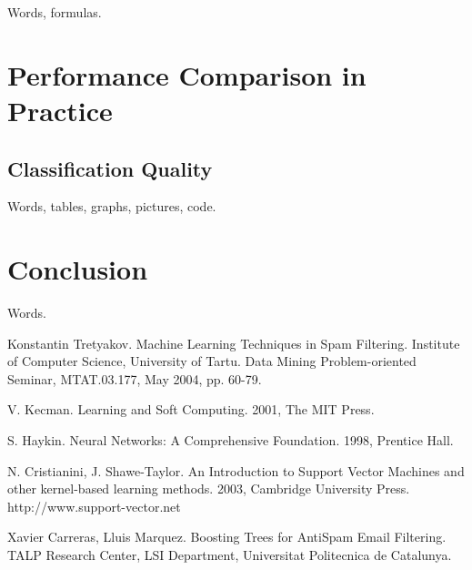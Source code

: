 \documentclass[12pt]{report}
\begin{document}
Words, formulas.

\newpage


\chapter{Performance Comparison in Practice}

\section{Classification Quality}

Words, tables, graphs, pictures, code.

\newpage


\chapter*{Conclusion}

Words.

\newpage



\begin{thebibliography}{30}

 Konstantin Tretyakov. Machine Learning Techniques in Spam Filtering. Institute of Computer Science, University of Tartu. Data Mining Problem-oriented Seminar, MTAT.03.177, May 2004, pp. 60-79.

 V. Kecman. Learning and Soft Computing. 2001, The MIT Press.

 S. Haykin. Neural Networks: A Comprehensive Foundation. 1998, Prentice
Hall.

 N. Cristianini, J. Shawe-Taylor. An Introduction to Support Vector Machines and other kernel-based learning methods. 2003, Cambridge University Press. http://www.support-vector.net

 Xavier Carreras, Lluis Marquez. Boosting Trees for AntiSpam
Email Filtering. TALP Research Center, LSI Department, Universitat Politecnica de Catalunya.

\end{thebibliography}
\end{document}

